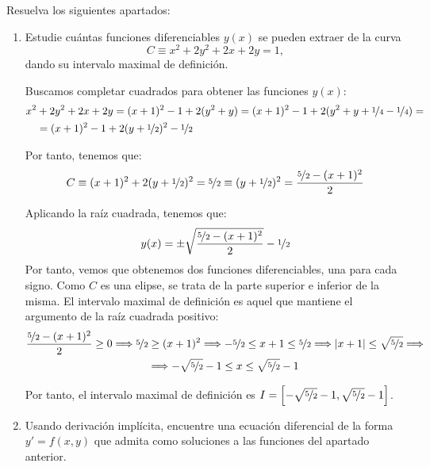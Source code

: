 \begin{ejercicio} Resuelva los siguientes apartados:
    \begin{enumerate}
        \item Estudie cuántas funciones diferenciables \(y(x)\) se pueden extraer de la curva
        \begin{equation*}
            C \equiv x^2 + 2y^2 + 2x + 2y = 1,
        \end{equation*}
        dando su intervalo maximal de definición.

        Buscamos completar cuadrados para obtener las funciones $y(x)$:
        \begin{align*}
            x^2 &+ 2y^2 + 2x + 2y = (x+1)^2 -1 + 2(y^2+y)
            = (x+1)^2 -1+ 2(y^2+y+\nicefrac{1}{4} - \nicefrac{1}{4})
            =\\&= (x+1)^2 -1+ 2(y+\nicefrac{1}{2})^2 - \nicefrac{1}{2}
        \end{align*}
        
        Por tanto, tenemos que:
        \begin{equation*}
            C\equiv (x+1)^2 + 2(y+\nicefrac{1}{2})^2 = \nicefrac{5}{2}
            \equiv (y+\nicefrac{1}{2})^2 = \dfrac{\nicefrac{5}{2} - (x+1)^2}{2}
        \end{equation*}

        Aplicando la raíz cuadrada, tenemos que:
        \begin{equation*}
            y(x) = \pm \sqrt{\dfrac{\nicefrac{5}{2} - (x+1)^2}{2}} - \nicefrac{1}{2}
        \end{equation*}
        Por tanto, vemos que obtenemos dos funciones diferenciables, una para cada signo. Como $C$ es una elipse, se trata de la parte superior e inferior de la misma. El intervalo maximal de definición es aquel que mantiene el argumento de la raíz cuadrada positivo:
        \begin{multline*}
            \dfrac{\nicefrac{5}{2} - (x+1)^2}{2} \geq 0 \Longrightarrow \nicefrac{5}{2} \geq (x+1)^2 \Longrightarrow -\nicefrac{5}{2} \leq x+1 \leq \nicefrac{5}{2} \Longrightarrow |x+1|\leq \sqrt{\nicefrac{5}{2}}
            \Longrightarrow \\ \Longrightarrow
            -\sqrt{\nicefrac{5}{2}}-1 \leq x \leq \sqrt{\nicefrac{5}{2}}-1
        \end{multline*}

        Por tanto, el intervalo maximal de definición es $I=\left[-\sqrt{\nicefrac{5}{2}}-1, \sqrt{\nicefrac{5}{2}}-1\right]$.
        \item Usando derivación implícita, encuentre una ecuación diferencial de la forma \(y' = f(x, y)\) que admita como soluciones a las funciones del apartado anterior.
        

\end{enumerate}
\end{ejercicio}
